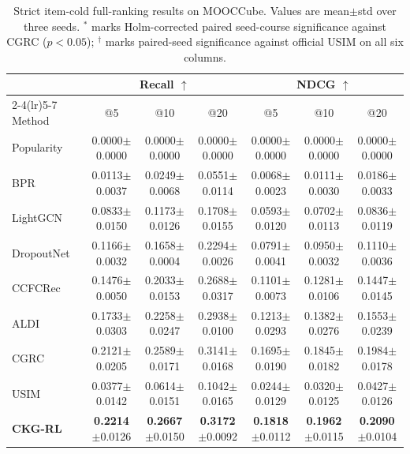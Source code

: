 \documentclass[sigconf,anonymous,review]{acmart}
\newcommand{\sd}[1]{{\footnotesize$\pm$#1}}
\newcommand{\sigmark}[1]{\rlap{\textsuperscript{\scriptsize #1}}}
\begin{document}
\begin{table}[t]
\centering
\caption{Strict item-cold full-ranking results on MOOCCube. Values are mean\(\pm\)std over three seeds. \(^{*}\) marks Holm-corrected paired seed-course significance against CGRC (\(p<0.05\)); \(^{\dagger}\) marks paired-seed significance against official USIM on all six columns.}
\label{tab:mooccube-cold}
\small
\setlength{\tabcolsep}{2.8pt}
\renewcommand{\arraystretch}{1.10}
\begin{tabular*}{\textwidth}{@{\extracolsep{\fill}}lcccccc}
\toprule
& \multicolumn{3}{c}{Recall \(\uparrow\)} & \multicolumn{3}{c}{NDCG \(\uparrow\)} \\
\cmidrule(lr){2-4}\cmidrule(lr){5-7}
Method & \multicolumn{1}{c}{@5} & \multicolumn{1}{c}{@10} & \multicolumn{1}{c}{@20} & \multicolumn{1}{c}{@5} & \multicolumn{1}{c}{@10} & \multicolumn{1}{c}{@20} \\
\midrule
Popularity & 0.0000\sd{0.0000} & 0.0000\sd{0.0000} & 0.0000\sd{0.0000} & 0.0000\sd{0.0000} & 0.0000\sd{0.0000} & 0.0000\sd{0.0000} \\
BPR~\cite{rendle2009bpr} & 0.0113\sd{0.0037} & 0.0249\sd{0.0068} & 0.0551\sd{0.0114} & 0.0068\sd{0.0023} & 0.0111\sd{0.0030} & 0.0186\sd{0.0033} \\
LightGCN~\cite{he2020lightgcn} & 0.0833\sd{0.0150} & 0.1173\sd{0.0126} & 0.1708\sd{0.0155} & 0.0593\sd{0.0120} & 0.0702\sd{0.0113} & 0.0836\sd{0.0119} \\
DropoutNet~\cite{volkovs2017dropoutnet} & 0.1166\sd{0.0032} & 0.1658\sd{0.0004} & 0.2294\sd{0.0026} & 0.0791\sd{0.0041} & 0.0950\sd{0.0032} & 0.1110\sd{0.0036} \\
CCFCRec~\cite{zhou2023ccfcrec} & 0.1476\sd{0.0050} & 0.2033\sd{0.0153} & 0.2688\sd{0.0317} & 0.1101\sd{0.0073} & 0.1281\sd{0.0106} & 0.1447\sd{0.0145} \\
ALDI~\cite{huang2023aldi} & 0.1733\sd{0.0303} & 0.2258\sd{0.0247} & 0.2938\sd{0.0100} & 0.1213\sd{0.0293} & 0.1382\sd{0.0276} & 0.1553\sd{0.0239} \\
CGRC~\cite{kim2024cgrc} & 0.2121\sd{0.0205} & 0.2589\sd{0.0171} & 0.3141\sd{0.0168} & 0.1695\sd{0.0190} & 0.1845\sd{0.0182} & 0.1984\sd{0.0178} \\
USIM~\cite{zhao2024usim} & 0.0377\sd{0.0142} & 0.0614\sd{0.0151} & 0.1042\sd{0.0165} & 0.0244\sd{0.0129} & 0.0320\sd{0.0125} & 0.0427\sd{0.0126} \\
\textbf{CKG-RL}\sigmark{$\dagger$} & \textbf{0.2214}\sd{0.0126}\sigmark{*} & \textbf{0.2667}\sd{0.0150}\sigmark{*} & \textbf{0.3172}\sd{0.0092} & \textbf{0.1818}\sd{0.0112}\sigmark{*} & \textbf{0.1962}\sd{0.0115}\sigmark{*} & \textbf{0.2090}\sd{0.0104}\sigmark{*} \\
\bottomrule
\end{tabular*}
\end{table}
\end{document}
